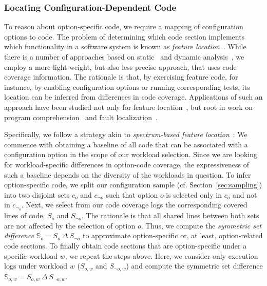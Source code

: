 {{{\subsubsection{Locating Configuration-Dependent Code}
To reason about option-specific code, we require a mapping of configuration options to code. 
The problem of determining which code section implements which functionality in a software system is known as \emph{feature location}~\cite{rubin_feature_2013}. 
While there is a number of approaches based on static~\cite{velez_2020_configcrusher_jase,lillack_2018_lotrack_tse,luo_2019_cova} and dynamic analysis~\cite{bell_phosphor_2014,velez_comprex_2021,splat_kim_2013}, we employ a more light-weight,  but also less precise approach, that uses code coverage information.
The rationale is that, by exercising feature code, for instance, by enabling configuration options or running corresponding tests, its location can be inferred from differences in code coverage. 
Applications of such an approach have been studied not only for feature location~\cite{wong_integrated_2005,sulir_annotation_2015,michelon_spectrum_2021,perez_framing_2016}, but root in work on program comprehension~\cite{wilde_early_1996,wilde_reconnaissance_1995,sherwood_reducing_nodate,perez_diagnosis_2014,castro_pangolin_2019} and fault localization~\cite{agrawal_fault_1995,wong_faultloc_2016}. 


Specifically, we follow  a strategy akin to  \textit{spectrum-based feature location}~\cite{michelon_spectrum_2021}:
We commence with obtaining a baseline of all code that can be associated with a configuration option in the scope of our workload selection. Since we are looking for workload-specific differences in option-code coverage, the expressiveness of such a baseline depends on the diversity of the workloads in question. To infer option-specific code, we split our configuration sample (cf. Section~\ref{sec:sampling}) into two disjoint sets $c_o$ and $c_{\neg o}$ such that option $o$ is selected only in $c_o$ and not in $c_{\neg_o}$. Next, we select from our code coverage logs the corresponding covered lines of code, $S_o$ and $S_{\neg o}$.  The rationale is that all shared lines between both sets are not affected by the selection of option $o$. Thus, we compute the \textit{symmetric set difference} $\mathbb{S}_o = S_o~\Delta~S_{\neg o}$ to approximate option-specific or, at least, option-related code sections. To finally obtain code sections that are option-specific under a specific workload $w$, we repeat the steps above. Here, we consider only execution logs under workload $w$ ($S_{o, w}$ and $S_{\neg o, w}$) and compute the symmetric set difference $\mathbb{S}_{o,w}=S_{o,w}~\Delta~S_{\neg o, w}.$


}}}
